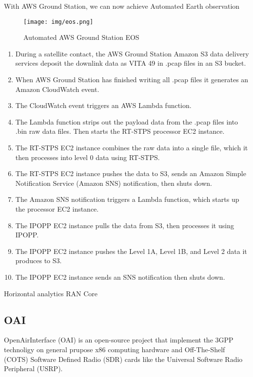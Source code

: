 \documentclass[12pt, draftclsnofoot, onecolumn]{IEEEtran}
\begin{document}
With AWS Ground Station, we can now achieve Automated Earth observation\cite{eos}
\begin{figure}[H]
	\centering
	\texttt{[image: img/eos.png]}
	\caption{Automated AWS Ground Station EOS}
\end{figure}
\begin{enumerate}
	\item During a satellite contact, the AWS Ground Station Amazon S3 data delivery services deposit the downlink data as VITA 49 in .pcap files in an S3 bucket.
	\item When AWS Ground Station has finished writing all .pcap files it generates an Amazon CloudWatch event.
	\item The CloudWatch event triggers an AWS Lambda function.
	\item The Lambda function strips out the payload data from the .pcap files into .bin raw data files. Then starts the RT-STPS processor EC2 instance.
	\item The RT-STPS EC2 instance combines the raw data into a single file, which it then processes into level 0 data using RT-STPS.
	\item The RT-STPS EC2 instance pushes the data to S3, sends an Amazon Simple Notification Service (Amazon SNS) notification, then shuts down.
	\item The Amazon SNS notification triggers a Lambda function, which starts up the processor EC2 instance.
	\item The IPOPP EC2 instance pulls the data from S3, then processes it using IPOPP.
	\item The IPOPP EC2 instance pushes the Level 1A, Level 1B, and Level 2 data it produces to S3.
	\item The IPOPP EC2 instance sends an SNS notification then shuts down.
	
\end{enumerate}







Horizontal analytics
RAN
Core



\subsection{OAI}
OpenAirInterface (OAI)\cite{OAI} is an open-source project that implement the 3GPP technoligy on general prupose x86 computing hardware and Off-The-Shelf (COTS) Software Defined Radio (SDR) cards like the Universal Software Radio Peripheral (USRP).
\end{document}
